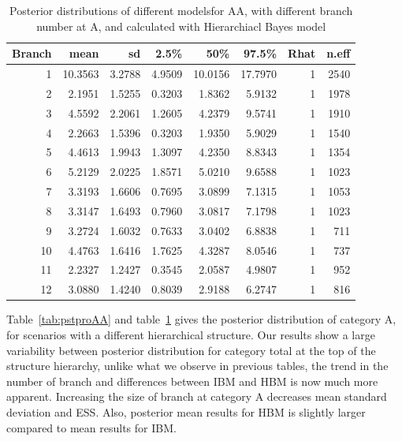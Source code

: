 \begin{table}[!h]
	\centering
	\begin{tabular}{rrrrrrrr}
		\hline
		Branch & mean & sd & 2.5\% & 50\% & 97.5\% & Rhat & n.eff \\ 
		\hline
		1 & 10.3563 & 3.2788 & 4.9509 & 10.0156 & 17.7970 & 1 & 2540 \\ 
		2 & 2.1951 & 1.5255 & 0.3203 & 1.8362 & 5.9132 & 1 & 1978 \\ 
		3 & 4.5592 & 2.2061 & 1.2605 & 4.2379 & 9.5741 & 1 & 1910 \\ 
		4 & 2.2663 & 1.5396 & 0.3203 & 1.9350 & 5.9029 & 1 & 1540 \\ 
		5 & 4.4613 & 1.9943 & 1.3097 & 4.2350 & 8.8343 & 1 & 1354 \\ 
		6 & 5.2129 & 2.0225 & 1.8571 & 5.0210 & 9.6588 & 1 & 1023 \\ 
		7 & 3.3193 & 1.6606 & 0.7695 & 3.0899 & 7.1315 & 1 & 1053 \\ 
		8 & 3.3147 & 1.6493 & 0.7960 & 3.0817 & 7.1798 & 1 & 1023 \\ 
		9 & 3.2724 & 1.6032 & 0.7633 & 3.0402 & 6.8838 & 1 & 711 \\ 
		10 & 4.4763 & 1.6416 & 1.7625 & 4.3287 & 8.0546 & 1 & 737\\ 
		11 & 2.2327 & 1.2427 & 0.3545 & 2.0587 & 4.9807 & 1 & 952 \\ 
		12 & 3.0880 & 1.4240 & 0.8039 & 2.9188 & 6.2747 & 1 & 816 \\ 
		\hline
	\end{tabular}
	\caption{Posterior distributions of different modelsfor AA, with different branch number at A, and calculated with Hierarchiacl Bayes model} 
	\label{tab:pstproAAh}
\end{table}

Table~\ref{tab:pstproAA} and table~\ref{tab:pstproAAh} gives the posterior distribution of category A, for scenarios with a different hierarchical structure. Our results show a large variability between posterior distribution for category total at the top of the structure hierarchy, unlike what we observe in previous tables, the trend in the number of branch and differences between IBM and HBM is now much more apparent.  Increasing the size of branch at category A decreases mean standard deviation and ESS. Also, posterior mean results for HBM is slightly larger compared to mean results for IBM. 
		
